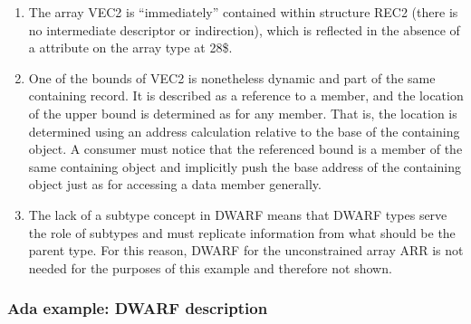 \begin{enumerate}[1)]
\item The array VEC2 is ``immediately'' contained within structure
REC2 (there is no intermediate descriptor or indirection),
which is reflected in the absence of a 
attribute on the array type at 28\$.

\item One of the bounds of VEC2 is nonetheless dynamic and part of
the same containing record. It is described as a reference to
a member, and the location of the upper bound is determined
as for any member. That is, the location is determined using
an address calculation relative to the base of the containing
object.  A consumer must notice that the referenced bound is a
member of the same containing object and implicitly push the
base address of the containing object just as for accessing
a data member generally.

\item The lack of a subtype concept in DWARF means that DWARF types
serve the role of subtypes and must replicate information from
what should be the parent type. For this reason, DWARF for
the unconstrained array ARR is not needed for the purposes
of this example and therefore not shown.
\end{enumerate}

\subsubsection{Ada example: DWARF description}
\label{app:adaexampledwarfdescription}

